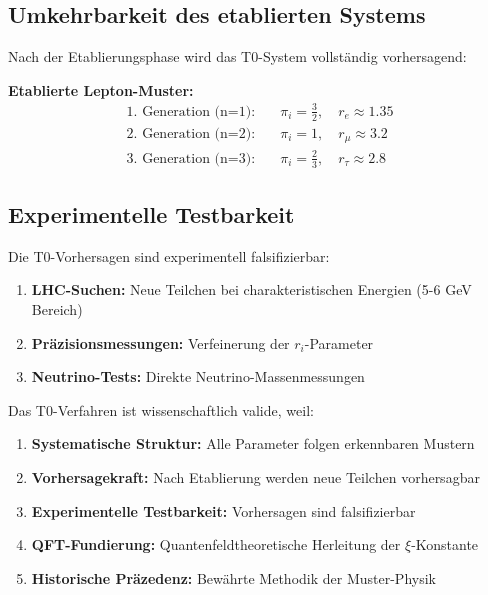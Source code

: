 	\subsection{Umkehrbarkeit des etablierten Systems}
	\label{subsec:umkehrbarkeit}
	
	Nach der Etablierungsphase wird das T0-System vollständig vorhersagend:
	
	\textbf{Etablierte Lepton-Muster:}
	\begin{align}
		\text{1. Generation (n=1):} \quad &\pi_i = \frac{3}{2}, \quad r_e \approx 1.35 \\
		\text{2. Generation (n=2):} \quad &\pi_i = 1, \quad r_\mu \approx 3.2 \\
		\text{3. Generation (n=3):} \quad &\pi_i = \frac{2}{3}, \quad r_\tau \approx 2.8
	\end{align}
	
	\subsection{Experimentelle Testbarkeit}
	\label{subsec:experimentelle_testbarkeit}
	
	Die T0-Vorhersagen sind experimentell falsifizierbar:
	
	\begin{enumerate}
		\item \textbf{LHC-Suchen:} Neue Teilchen bei charakteristischen Energien (5-6 GeV Bereich)
		\item \textbf{Präzisionsmessungen:} Verfeinerung der $r_i$-Parameter
		\item \textbf{Neutrino-Tests:} Direkte Neutrino-Massenmessungen
	\end{enumerate}
	
	Das T0-Verfahren ist wissenschaftlich valide, weil:
	
	\begin{enumerate}
		\item \textbf{Systematische Struktur:} Alle Parameter folgen erkennbaren Mustern
		\item \textbf{Vorhersagekraft:} Nach Etablierung werden neue Teilchen vorhersagbar
		\item \textbf{Experimentelle Testbarkeit:} Vorhersagen sind falsifizierbar
		\item \textbf{QFT-Fundierung:} Quantenfeldtheoretische Herleitung der $\xi$-Konstante
		\item \textbf{Historische Präzedenz:} Bewährte Methodik der Muster-Physik
	\end{enumerate}
	
